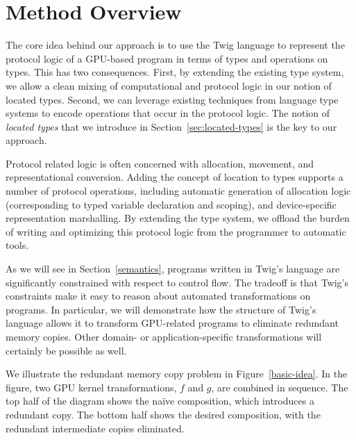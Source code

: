 
\section{Method Overview}

The core idea behind our approach is to use the Twig language to represent the
protocol logic of a GPU-based program in terms of types and operations on types.
This has two consequences. First, by extending the existing type system, we
allow a clean mixing of computational and protocol logic in our notion of
located types. Second, we can leverage existing techniques from language type
systems to encode operations that occur in the protocol logic. The notion of
\emph{located types} that we introduce in Section~\ref{sec:located-types} is the
key to our approach.

Protocol related logic is often concerned with allocation, movement, and
representational conversion. Adding the concept of location to types supports a
number of protocol operations, including automatic generation of allocation
logic (corresponding to typed variable declaration and scoping), and
device-specific representation marshalling. By extending the type system, we
offload the burden of writing and optimizing this protocol logic from the
programmer to automatic tools.

As we will see in Section~\ref{semantics}, programs written in Twig's language
are significantly constrained with respect to control flow. The tradeoff is that
Twig's constraints make it easy to reason about automated transformations on
programs. In particular, we will demonstrate how the structure of Twig's
language allows it to transform GPU-related programs to eliminate redundant
memory copies. Other domain- or application-specific transformations will
certainly be possible as well.

We illustrate the redundant memory copy problem in Figure~\ref{basic-idea}. In
the figure, two GPU kernel transformations, $f$ and $g$, are combined in
sequence. The top half of the diagram shows the na\"ive composition, which
introduces a redundant copy. The bottom half shows the desired composition, with
the redundant intermediate copies eliminated.

